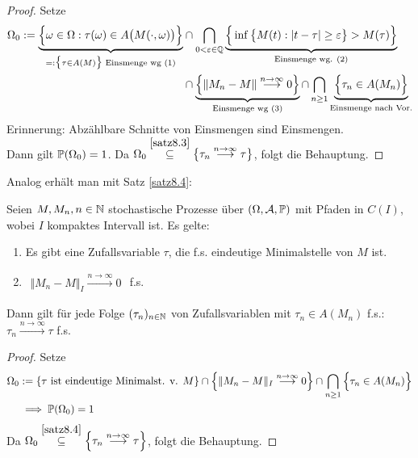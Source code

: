 \begin{proof}
	Setze
	\begin{align*}
		\Omega_0:=\underbrace{\Big\lbrace\omega\in\Omega:\tau(\omega)\in A\big(M(\cdot,\omega)\big)\Big\rbrace}_{=:\big\lbrace\tau\in A(M)\big\rbrace\text{ Einsmenge wg (1)}}
		&\cap\bigcap\limits_{0<\varepsilon\in\Q}
		\underbrace{\Big\lbrace\inf\limits\big\lbrace M(t):|t-\tau|\geq\varepsilon\big\rbrace>M(\tau)\Big\rbrace}_{\text{Einsmenge wg. (2)}}\\
		&\cap\underbrace{\Big\lbrace\Vert M_n-M\Vert\overset{n\to\infty}{\longrightarrow}0\Big\rbrace}_{\text{Einsmenge wg (3)}}
		\cap\bigcap\limits_{n\geq1}\underbrace{\Big\lbrace\tau_n\in A(M_n)\Big\rbrace}_{\text{Einsmenge nach Vor.}}
	\end{align*}
	Erinnerung: Abzählbare Schnitte von Einsmengen sind Einsmengen.\\
	Dann gilt $\P(\Omega_0)=1$. 
	Da $\Omega_0\overset{\ref{satz8.3}}{\subseteq}\big\lbrace\tau_n\overset{n\to\infty}{\longrightarrow}\tau\big\rbrace$, folgt die Behauptung.
\end{proof}

Analog erhält man mit Satz \ref{satz8.4}:

\begin{satz}\label{satz8.6}
	Seien $M,M_n,n\in\N$ stochastische Prozesse über $(\Omega,\A,\P)$ mit Pfaden in $C(I)$,
	wobei $I$ kompaktes Intervall ist.
	Es gelte:
	\begin{enumerate}[label=(\arabic*)]
		\item Es gibt eine Zufallsvariable $\tau$, die f.s. eindeutige Minimalstelle von $M$ ist.
		\item $\begin{aligned}
			\Vert M_n-M\Vert_I\overset{n\to\infty}{\longrightarrow}0
		\end{aligned}$ f.s.
	\end{enumerate}
	Dann gilt für jede Folge $(\tau_n)_{n\in\N}$ von Zufallsvariablen mit $\tau_n\in A(M_n)$ f.s.:
	$\tau_n\overset{n\to\infty}{\longrightarrow}\tau$ f.s.
\end{satz}

\begin{proof}
	Setze
	\begin{align*}
		 \Omega_0&:=\lbrace\tau\text{ ist eindeutige Minimalst. v. }M\rbrace
		 \cap\Big\lbrace\Vert M_n-M\Vert_I\overset{n\to\infty}{\longrightarrow}0\Big\rbrace
		 \cap\bigcap\limits_{n\geq1}\Big\lbrace\tau_n\in A(M_n)\Big\rbrace\\
		 &\implies\P(\Omega_0)=1
	\end{align*}		
	Da $\Omega_0\overset{\ref{satz8.4}}{\subseteq}\Big\lbrace\tau_n\overset{n\to\infty}{\longrightarrow}\tau\Big\rbrace$, folgt die Behauptung.
\end{proof}

